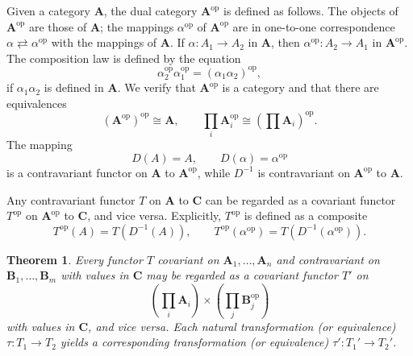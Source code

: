 \documentclass[11pt,a4paper]{report}
\newtheorem{theorem}{Theorem}
\begin{document}
Given a category $\mathbf{A}$, the dual category $\mathbf{A}^\text{op}$ is defined as follows. The objects of $\mathbf{A}^\text{op}$ are those
of $\mathbf{A}$; the mappings $\alpha^\text{op}$ of $\mathbf{A}^\text{op}$ are in one\hyp{}to\hyp{}one correspondence $\alpha\rightleftarrows\alpha^\text{op}$
with the mappings of $\mathbf{A}$. If $\alpha:A_1\rightarrow A_2$ in $\mathbf{A}$, then $\alpha^\text{op}:A_2\rightarrow A_1$ in $\mathbf{A}^\text{op}$.
The composition law is defined by the equation
\begin{equation*}
	\alpha_2^\text{op}\alpha_1^\text{op}= {(\alpha_1\alpha_2)}^\text{op},
\end{equation*}
if $\alpha_1\alpha_2$ is defined in $\mathbf{A}$. We verify that $\mathbf{A}^\text{op}$ is a category and that there are equivalences
\begin{equation*}
	{(\mathbf{A}^\text{op})}^\text{op}\cong\mathbf{A},\qquad \prod_i\mathbf{A}_i^\text{op}\cong{\left(\prod\mathbf{A}_i\right)}^\text{op}.
\end{equation*}
The mapping
\begin{equation*}
	D(A)= A,\qquad D(\alpha)= \alpha^\text{op}
\end{equation*}
is a contravariant functor on $\mathbf{A}$ to $\mathbf{A}^\text{op}$, while $D^{-1}$ is contravariant on $\mathbf{A}^\text{op}$ to $\mathbf{A}$.

Any contravariant functor $T$ on $\mathbf{A}$ to $\mathbf{C}$ can be regarded as a covariant functor $T^\text{op}$ on $\mathbf{A}^\text{op}$ to
$\mathbf{C}$, and vice versa. Explicitly, $T^\text{op}$ is defined as a composite
\begin{equation*}
	T^\text{op}(A)= T(D^{-1}(A)),\qquad  T^\text{op}(\alpha^\text{op})= T(D^{-1}(\alpha^\text{op})).
\end{equation*}
\begin{theorem}
	Every functor $T$ covariant on $\mathbf{A}_1,\dotsc,\mathbf{A}_n$ and contravariant on $\mathbf{B}_1,\dotsc,\mathbf{B}_m$ with
	values in $\mathbf{C}$ may be regarded as a covariant functor $T'$ on
	\begin{equation*}
		\left(\prod_i\mathbf{A}_i\right)\times\left(\prod_j\mathbf{B}_j^\text{op}\right)
	\end{equation*}
	with values in $\mathbf{C}$, and vice versa. Each natural transformation (or equivalence) $\tau:T_1\rightarrow T_2$ yields a
	corresponding transformation (or equivalence) $\tau':T_1'\rightarrow T_2'$.
\end{theorem}
\end{document}
